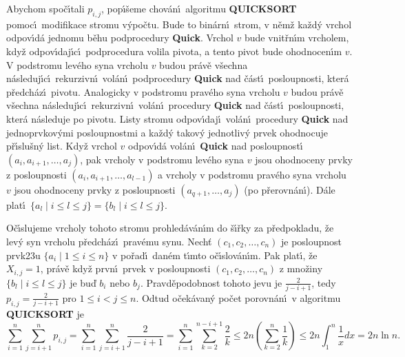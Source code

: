 \documentclass[a4paper,12pt]{article}
\begin{document}
\flushpar Abychom spo\v c\'\i tali $p_{i,j}$, pop\'\i\v seme chov\'an\'\i\ algoritmu 
{\bf QUICKSORT} pomoc\'\i\ modifikace stromu v\'ypo\v ctu. Bude to bin\'arn\'\i\ 
strom, v n\v em\v z ka\v zd\'y vrchol odpov\'\i d\'a jednomu 
b\v ehu podprocedury {\bf Quick}. Vrchol $v$ bude vnit\v rn\'\i m 
vrcholem, 
kdy\v z odpov\'\i da\-j\'\i\-c\'\i\ podprocedura volila pivota, a tento 
pivot bude ohodnocen\'\i m $v$. V podstromu lev\'eho syna vrcholu $
v$
budou pr\'av\v e v\v sechna n\'asleduj\'\i c\'\i\ rekurzivn\'\i\ vol\'an\'\i\ podprocedury 
{\bf Quick} nad \v c\'ast\'\i\ posloupnosti, kter\'a p\v redch\'az\'\i\ pivotu. 
Analogicky v podstromu 
prav\'eho syna vrcholu $v$ budou pr\'av\v e v\v sechna n\'asleduj\'\i c\'\i\ 
rekurzivn\'\i\ vol\'an\'\i\ procedury {\bf Quick} nad \v c\'ast\'\i\ 
posloupnosti, kter\'a n\'asleduje po pivotu. 
Listy stromu odpov\'\i daj\'\i\ vol\'an\'\i\ procedury {\bf Quick} nad 
jednoprvkov\'ymi posloupnost\-mi a ka\v zd\'y takov\'y jednotliv\'y 
prvek ohodnocuje p\v r\'\i slu\v sn\'y  
list. Kdy\v z vrchol $v$ odpov\'\i d\'a vol\'an\'\i\ {\bf Quick} nad posloupnost\'\i\ 
$(a_i,a_{i+1},\dots,a_j)$, pak vrcholy v podstromu lev\'eho syna $
v$ jsou 
ohodnoceny prvky z posloupnosti $(a_i,a_{i+1},\dots,a_{l-1})$ a vrcholy v 
podstromu prav\'eho syna vrcholu $v$ jsou ohodnoceny prvky z posloupnosti 
$(a_{q+1},\dots,a_j)$ (po p\v rerovn\'an\'\i ).
D\'ale plat\'\i\ $\{a_l\mid i\le l\le j\}=\{b_l\mid i\le l\le j\}$.
\medskip

\flushpar O\v c\'\i slujeme vrcholy tohoto stromu prohled\'av\'an\'\i m do 
\v s\'\i\v rky za p\v redpokladu, \v ze lev\'y syn vrcholu p\v redch\'az\'\i\ 
prav\'emu synu. Nech\v t $(c_1,c_2,\dots,c_n)$ je posloupnost 
prvk\accent23u $\{a_i\mid 1\le i\le n\}$ v po\v rad\'\i\ dan\'em t\'\i mto 
o\v c\'\i slov\'an\'\i m. Pak plat\'\i , \v ze $X_{i,j}=1$, pr\'av\v e kdy\v z prvn\'\i\ 
prvek v posloupnosti $(c_1,c_2,\dots,c_n)$ z mno\v zi\-ny 
$\{b_l\mid i\le l\le j\}$ je bu\v d $b_i$ nebo $b_j$. Pravd\v epodobnost tohoto 
jevu je $\frac 2{j-i+1}$, tedy $p_{i,j}=\frac 2{j-i+1}$ pro $1\le 
i<j\le n$. Odtud 
o\v cek\'avan\'y po\v cet porovn\'an\'\i\ v algoritmu {\bf QUICKSORT} je
$$\sum_{i=1}^n\sum_{j=i+1}^np_{i,j}=\sum_{i=1}^n\sum_{j=i+1}^n\frac 
2{j-i+1}=\sum_{i=1}^n\sum_{k=2}^{n-i+1}\frac 2k\le 2n(\sum_{k=2}^
n\frac 1k)\le 2n\int_1^n\frac 1xdx=2n\ln n.$$
\medskip
\end{document}
